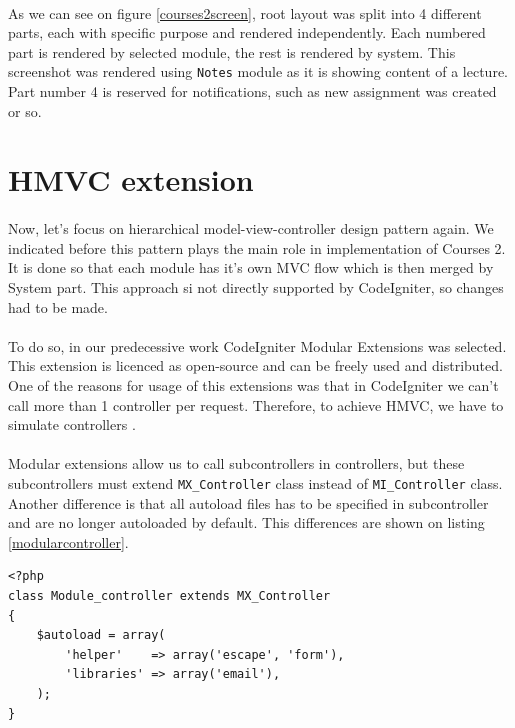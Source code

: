 \paragraph{}
As we can see on figure \ref{courses2screen}, root layout was split into 4 different parts, each with specific purpose and rendered independently. Each numbered part is rendered by selected module, the rest is rendered by system. This screenshot was rendered using \texttt{Notes} module as it is showing content of a lecture. Part number 4 is reserved for notifications, such as new assignment was created or so.

\section{HMVC extension}
\paragraph{}
Now, let's focus on hierarchical model-view-controller design pattern again. We indicated before this pattern plays the main role in implementation of Courses 2. It is done so that each module has it's own MVC flow which is then merged by System part. This approach si not directly supported by CodeIgniter, so changes had to be made.

\paragraph{}
To do so, in our predecessive work CodeIgniter Modular Extensions \cite{modularextensions} was selected. This extension is licenced as open-source and can be freely used and distributed. One of the reasons for usage of this extensions was that in CodeIgniter we can’t call more than 1 controller per request. Therefore, to achieve HMVC, we have to simulate controllers \cite{modularextensions}. 

\paragraph{}
Modular extensions allow us to call subcontrollers in controllers, but these subcontrollers must extend \texttt{MX\_Controller} class instead of \texttt{MI\_Controller} class. Another difference is that all autoload files has to  be specified in subcontroller and are no longer autoloaded by default. This differences are shown on listing \ref{modularcontroller}.

\begin{lstlisting}[label={modularcontroller}, caption={Module controller}]
<?php     
class Module_controller extends MX_Controller 
{
    $autoload = array(
        'helper'    => array('escape', 'form'),
        'libraries' => array('email'),
    );
}
\end{lstlisting}

